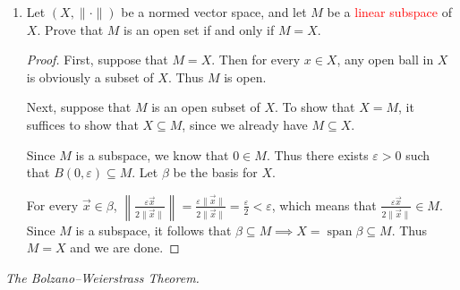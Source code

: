 \documentclass{article}
\theoremstyle{plain} %
\numberwithin{thm}{section} %
\theoremstyle{definition}
\begin{document}
\begin{enumerate}[label=(\alph*)]
\begin{proof}
        \end{proof}
        \item Let $(X,\|\cdot\|)$ be a normed vector space, and let $M$ be a \textcolor{red}{linear subspace} of $X$. Prove that $M$ is an open set if and only if $M=X$.
        
        \begin{proof}
            First, suppose that \(M=X\). Then for every \(x \in X\), any open ball in \(X\) is obviously a subset of \(X\). Thus \(M\) is open.

            Next, suppose that \(M\) is an open subset of \(X\). To show that \(X=M\), it suffices to show that \(X \subseteq M\), since we already have \(M \subseteq X\).

            Since \(M\) is a subspace, we know that \(0 \in M\). Thus there exists \(\varepsilon > 0\) such that \(B(0, \varepsilon) \subseteq M\). Let \(\beta\) be the basis for \(X\).
            
            For every \(\vec{x} \in \beta\), \(\left\lVert \frac{\varepsilon \vec{x}}{2\|\vec{x}\|} \right\rVert = \frac{\varepsilon\|\vec{x}\|}{2\|\vec{x}\|} = \frac{\varepsilon}{2} < \varepsilon\), which means that \(\frac{\varepsilon \vec{x}}{2\|\vec{x}\|} \in M\). Since \(M\) is a subspace, it follows that \(\beta \subseteq M \implies X = \operatorname{span} \beta \subseteq M\). Thus \(M=X\) and we are done.

        \end{proof}
    \end{enumerate}

    \exercise \textit{The Bolzano--Weierstrass Theorem.}
\end{document}
